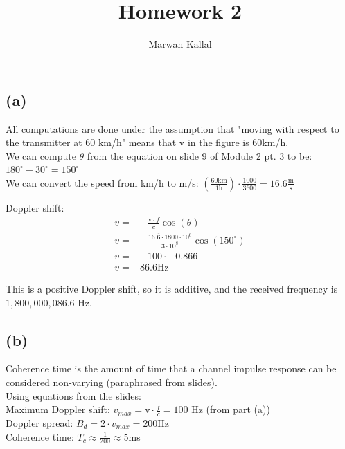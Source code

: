 \documentclass[]{article}
\title{Homework 2}
\author{Marwan Kallal}
\begin{document}
\maketitle

\section{}
\subsection*{(a)}
All computations are done under the assumption that "moving with respect to the transmitter at 60 km/h" means that v in the figure is 60km/h.\\
We can compute $\theta$ from the equation on slide 9 of Module 2 pt. 3 to be:\\ $180^\circ - 30^\circ = 150^\circ$\\
We can convert the speed from km/h to m/s: $ (\frac{60\text{km}}{1\text{h}}) \cdot \frac{1000}{3600} = 16.\overline{6}\frac{\text{m}}{\text{s}}$

Doppler shift:
\begin{align*}
	v =& -\frac{\text{v}\cdot f}{c}\cos(\theta)\\
	v =& -\frac{16.\overline{6} \cdot 1800\cdot10^{6}}{3\cdot10^8}\cos(150^\circ)\\
	v =& - 100\cdot -0.866\\
	v =& 86.6 \text{Hz}
\end{align*}

This is a positive Doppler shift, so it is additive, and the received frequency is $1,800,000,086.6$ Hz.

\subsection*{(b)}
Coherence time is the amount of time that a channel impulse response can be considered non-varying (paraphrased from slides).\\
Using equations from the slides:\\
Maximum Doppler shift: $v_\textit{max} = \text{v} \cdot \frac{f}{c} = 100$ Hz (from part (a)) \\
Doppler spread: $B_d = 2\cdot v_{max} = 200$Hz\\
Coherence time: $T_c \approx \frac{1}{200} \approx 5$ms 
\end{document}
